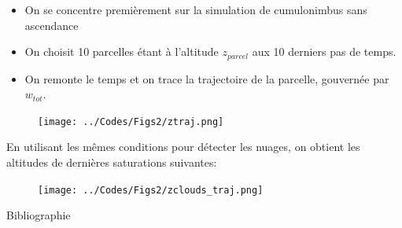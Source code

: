 \documentclass[10pt]{beamer}
\begin{document}
\begin{frame}{\secname}
    \begin{itemize}
        \item On se concentre premièrement sur la simulation de cumulonimbus sans ascendance
        \item On choisit 10 parcelles étant à l'altitude $z_{parcel}$ aux 10 derniers pas de temps. 
        \item On remonte le temps et on trace la trajectoire de la parcelle, gouvernée par $w_{tot}$.
    \end{itemize}
    \begin{figure}[hbtp]
        \centering
        \texttt{[image: ../Codes/Figs2/ztraj.png]}
    \end{figure}
\end{frame}

\begin{frame}{\secname}
    En utilisant les mêmes conditions pour détecter les nuages, on obtient les altitudes de dernières saturations suivantes:
    \begin{figure}[hbtp]
        \centering
        \texttt{[image: ../Codes/Figs2/zclouds\_traj.png]}
    \end{figure}
\end{frame}

\begin{frame}[allowframebreaks]{Bibliographie}
    \printbibliography
\end{frame}
\end{document}
